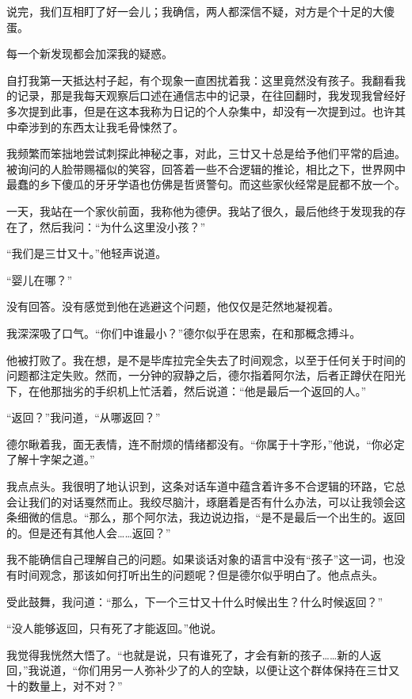 \documentclass[AutoFakeBold=true]{book}
\begin{document}
说完，我们互相盯了好一会儿；我确信，两人都深信不疑，对方是个十足的大傻蛋。

\vspace*{1em}{\kaishu 第一百零四日：}

每一个新发现都会加深我的疑惑。

自打我第一天抵达村子起，有个现象一直困扰着我：这里竟然没有孩子。我翻看我的记录，那是我每天观察后口述在通信志中的记录，在往回翻时，我发现我曾经好多次提到此事，但是在这本我称为日记的个人杂集中，却没有一次提到过。也许其中牵涉到的东西太让我毛骨悚然了。

我频繁而笨拙地尝试刺探此神秘之事，对此，三廿又十总是给予他们平常的启迪。被询问的人脸带赐福似的笑容，回答着一些不合逻辑的推论，相比之下，世界网中最蠢的乡下傻瓜的牙牙学语也仿佛是哲贤警句。而这些家伙经常是屁都不放一个。

一天，我站在一个家伙前面，我称他为德伊。我站了很久，最后他终于发现我的存在了，然后我问：``为什么这里没小孩？''

``我们是三廿又十。''他轻声说道。

``婴儿在哪？''

没有回答。没有感觉到他在逃避这个问题，他仅仅是茫然地凝视着。

我深深吸了口气。``你们中谁最小？''德尔似乎在思索，在和那概念搏斗。

他被打败了。我在想，是不是毕库拉完全失去了时间观念，以至于任何关于时间的问题都注定失败。然而，一分钟的寂静之后，德尔指着阿尔法，后者正蹲伏在阳光下，在他那拙劣的手织机上忙活着，然后说道：``他是最后一个返回的人。''

``返回？''我问道，``从哪返回？''

德尔瞅着我，面无表情，连不耐烦的情绪都没有。``你属于十字形，''他说，``你必定了解十字架之道。''

我点点头。我很明了地认识到，这条对话车道中蕴含着许多不合逻辑的环路，它总会让我们的对话戛然而止。我绞尽脑汁，琢磨着是否有什么办法，可以让我领会这条细微的信息。``那么，那个阿尔法，我边说边指，``是不是最后一个出生的。返回的。但是还有其他人会……返回？''

我不能确信自己理解自己的问题。如果谈话对象的语言中没有``孩子''这一词，也没有时间观念，那该如何打听出生的问题呢？但是德尔似乎明白了。他点点头。

受此鼓舞，我问道：``那么，下一个三廿又十什么时候出生？什么时候返回？''

``没人能够返回，只有死了才能返回。''他说。

我觉得我恍然大悟了。``也就是说，只有谁死了，才会有新的孩子……新的人返回，''我说道，``你们用另一人弥补少了的人的空缺，以便让这个群体保持在三廿又十的数量上，对不对？''
\end{document}
